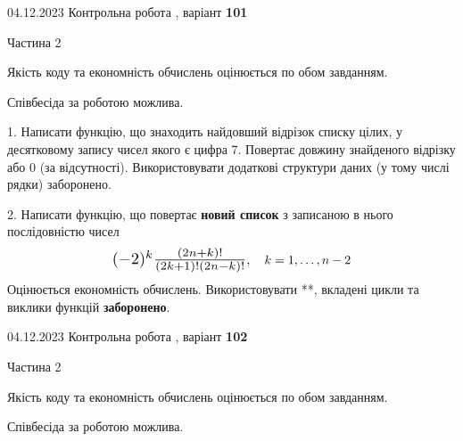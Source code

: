 \documentclass[12pt, ukrainian]{article}
\begin{document}
\begin {Huge}
{{04.12.2023 Контрольна робота , варіант  \No \textbf { 101 }\par}}

\begin{center}Частина 2
\end{center}
\vspace{10mm}
\end {Huge}

{
\begin {Large}
Якість коду та економність обчислень оцінюється по обом завданням.

Співбесіда за роботою можлива.

\vspace{5mm}

1. Написати функцію, що знаходить найдовший відрізок списку цілих, у десятковому запису чисел якого є цифра 7. Повертає довжину знайденого відрізку або $0$ (за відсутності). Використовувати додаткові структури даних (у тому числі рядки) заборонено.

\vspace{10mm}



2. 
Написати функцію, що повертає \textbf{новий список} з записаною в нього послідовністю чисел
$$\scalebox{1.3}{$(-2)^{k}\frac{(2n+k)!}{(2k+1)!(2n-k)!}$}, \quad k=1,\ldots,n-2$$
Оцінюється економність обчислень. Використовувати **, вкладені цикли та виклики функцій \textbf{заборонено}.

\end{Large}\newpage




\begin {Huge}
{{04.12.2023 Контрольна робота , варіант  \No \textbf { 102 }\par}}

\begin{center}Частина 2
\end{center}
\vspace{10mm}
\end {Huge}

{
\begin {Large}
Якість коду та економність обчислень оцінюється по обом завданням.

Співбесіда за роботою можлива.

\vspace{5mm}


\end{Large}}}
\end{document}

